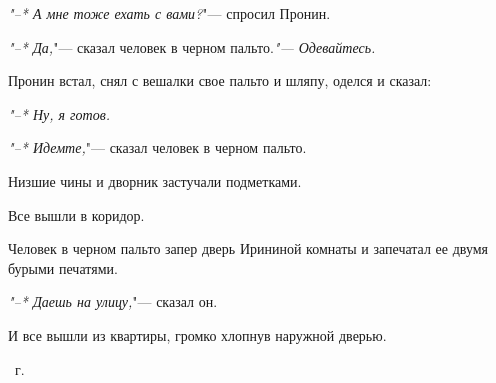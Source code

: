 \textsl{"--* А мне тоже ехать с  вами?}"---   спросил
Пронин.

\textsl{"--* Да,}"---   сказал человек в черном пальто.\textsl{"--- Одевайтесь.}

    Пронин встал,  снял с вешалки свое 
    пальто и шляпу, оделся и сказал:
    
\textsl{"--* Ну, я готов.}
    
\textsl{"--* Идемте,}"---   сказал  человек  в черном
пальто.

    Низшие чины и дворник застучали 
    подметками.
     
    Все вышли в коридор.
    
    Человек  в  черном  пальто  запер дверь
Ирининой комнаты и запечатал ее двумя бурыми
печатями.

\textsl{"--* Даешь на улицу,}"---  сказал он.
    
    И все вышли из квартиры, громко хлопнув
наружной дверью.


{\raggedleft
	\parbox{6cm}{~г.
	}

}